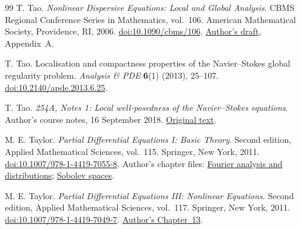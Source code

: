 \begin{thebibliography}{99}
T. Tao. \emph{Nonlinear Dispersive Equations: Local and Global Analysis}.
CBMS Regional Conference Series in Mathematics, vol.~106.
American Mathematical Society, Providence, RI, 2006.
\href{https://doi.org/10.1090/cbms/106}{doi:10.1090/cbms/106}.
\href{https://www.math.ucla.edu/~tao/preprints/chapter.pdf}{Author's draft}, Appendix~A.

T. Tao. Localisation and compactness properties of the Navier--Stokes
global regularity problem.
\emph{Analysis \& PDE} \textbf{6}(1) (2013), 25--107.
\href{https://doi.org/10.2140/apde.2013.6.25}{doi:10.2140/apde.2013.6.25}.

T. Tao. \emph{254A, Notes 1: Local well-posedness of the Navier--Stokes equations}.
Author's course notes, 16 September 2018.
\href{https://terrytao.wordpress.com/2018/09/16/254a-notes-1-local-well-posedness-of-the-navier-stokes-equations/}{Original text}.

M. E. Taylor. \emph{Partial Differential Equations I: Basic Theory}.
Second edition, Applied Mathematical Sciences, vol.~115. Springer, New York, 2011.
\href{https://doi.org/10.1007/978-1-4419-7055-8}{doi:10.1007/978-1-4419-7055-8}.
Author's chapter files:
\href{https://mtaylor.web.unc.edu/wp-content/uploads/sites/16915/2018/04/fourier.pdf}{Fourier analysis and distributions};
\href{https://mtaylor.web.unc.edu/wp-content/uploads/sites/16915/2018/04/chap4.pdf}{Sobolev spaces}.

M. E. Taylor. \emph{Partial Differential Equations III: Nonlinear Equations}.
Second edition, Applied Mathematical Sciences, vol.~117. Springer, New York, 2011.
\href{https://doi.org/10.1007/978-1-4419-7049-7}{doi:10.1007/978-1-4419-7049-7}.
\href{https://mtaylor.web.unc.edu/wp-content/uploads/sites/16915/2018/04/chap13.pdf}{Author's Chapter~13}.
\end{thebibliography}
